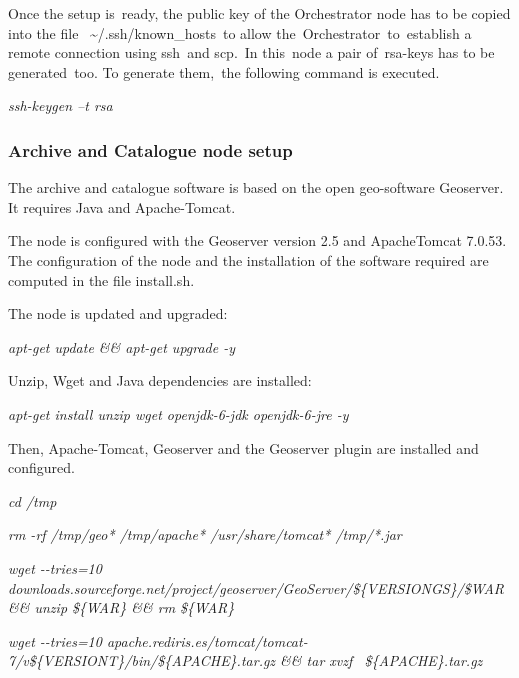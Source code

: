 \documentclass[a4paper]{article}
\begin{document}
\bigskip

Once the setup is\ ready, the public key of the Orchestrator node has to
be copied into the file \ \~{}/.ssh/known\_hosts\ to allow
the\ Orchestrator\ to\ establish a remote connection using ssh\ and
scp.\ In this\ node a pair of\ rsa-keys has to be generated\ too. To
generate them,\ the following command is executed.


\bigskip

{\itshape
ssh-keygen --t rsa\ }


\bigskip

\subsubsection[Archive and Catalogue node setup]{Archive and Catalogue
node setup}
\hypertarget{Toc390097027}{}The archive and catalogue software is based
on the open geo-software Geoserver. It requires Java and Apache-Tomcat.


\bigskip

The node is configured with the Geoserver version 2.5 and ApacheTomcat
7.0.53. The configuration of the node and the installation of the
software required are computed in the file install.sh.


\bigskip

The node is updated and upgraded:


\bigskip

{\itshape
apt-get update \&\& apt-get upgrade -y}


\bigskip

Unzip, Wget and Java dependencies are installed:


\bigskip

{\itshape
apt-get install unzip wget openjdk-6-jdk openjdk-6-jre -y}


\bigskip

Then, Apache-Tomcat, Geoserver and the Geoserver plugin are installed
and configured.\ 


\bigskip

{\itshape
cd /tmp}

{\itshape
rm -rf /tmp/geo* /tmp/apache* /usr/share/tomcat* /tmp/*.jar}

{\itshape
wget -{}-tries=10
downloads.sourceforge.net/project/geoserver/GeoServer/\$\{VERSIONGS\}/\$WAR\&\&
unzip \$\{WAR\} \&\& rm \$\{WAR\}}

{\itshape
wget -{}-tries=10
apache.rediris.es/tomcat/tomcat-7/v\$\{VERSIONT\}/bin/\$\{APACHE\}.tar.gz
\&\& tar xvzf \ \$\{APACHE\}.tar.gz\ }
\end{document}
